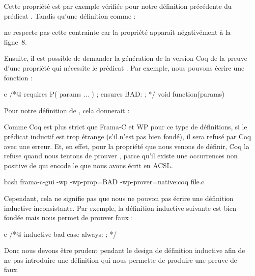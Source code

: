 Cette propriété est par exemple vérifiée pour notre définition précédente du
prédicat . Tandis qu'une définition comme :




ne respecte pas cette contrainte car la propriété 
apparaît négativément à la ligne~8.


Ensuite, il est possible de demander la génération de la version Coq de la
preuve d'une propriété qui nécessite le prédicat . Par exemple,
nous pouvons écrire une fonction :



\begin{CodeBlock}{c}
/*@
  requires P( params ... ) ;
  ensures  BAD: \false ;
*/ void function(params){

}
\end{CodeBlock}


Pour notre définition de , cela donnerait :




Comme Coq est plus strict que Frama-C et WP pour ce type de définitions, si
le prédicat inductif est trop étrange (s'il n'est pas bien fondé), il sera
refusé par Coq avec une erreur. Et, en effet, pour la propriété
 que nous venons de définir, Coq la refuse quand
nous tentons de prouver , parce
qu'il existe une occurrences non positive de 
qui encode le  que nous avons écrit en ACSL.

\begin{CodeBlock}{bash}
frama-c-gui -wp -wp-prop=BAD -wp-prover=native:coq file.c
\end{CodeBlock}




Cependant, cela ne signifie pas que nous ne pouvon pas écrire une définition
inductive inconsistante. Par exemple, la définition inductive suivante est bien
fondée mais nous permet de prouver faux :


\begin{CodeBlock}{c}
/*@
  inductive bad {
    case always: \false ;
  }
*/
\end{CodeBlock}


Donc nous devons être prudent pendant le design de définition inductive afin
de ne pas introduire une définition qui nous permette de produire une preuve de
faux.


